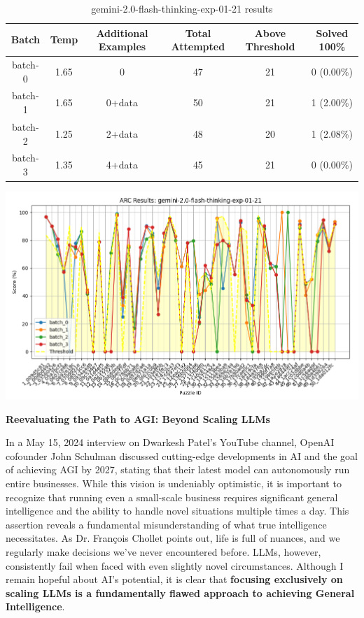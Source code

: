 \documentclass[11pt]{scrartcl}
\begin{document}
\begin{table}[h]
    \centering
    \begin{tabular}{|c|c|c|c|c|c|}
        \hline
        Batch & Temp & Additional Examples & Total Attempted & Above Threshold & Solved 100\% \\ 
        \hline
        batch-0 & 1.65 & 0 & 47 & 21 & 0 (0.00\%)   \\ 
        batch-1 & 1.65 & 0+data & 50 & 21 & 1 (2.00\%)   \\ 
        batch-2 & 1.25 & 2+data & 48 & 20 & 1 (2.08\%)   \\ 
        batch-3 & 1.35 & 4+data & 45 & 21 & 0 (0.00\%)   \\ 
        \hline
    \end{tabular}
    \caption{ gemini-2.0-flash-thinking-exp-01-21 results }
    \label{tab:example}
\end{table}

\includegraphics[width=0.99\linewidth, center]{gemini-2.0-flash-thinking-exp-01-21.png}

\vspace{2cm}

\begin{huge}
\textbf{Reevaluating the Path to AGI: Beyond Scaling LLMs}
\end{huge}
In a May 15, 2024 interview on Dwarkesh Patel’s YouTube channel\cite{ref8}, OpenAI cofounder John Schulman discussed cutting-edge developments in AI and the goal of achieving AGI by 2027, stating that their latest model can autonomously run entire businesses. While this vision is undeniably optimistic, it is important to recognize that running even a small-scale business requires significant general intelligence and the ability to handle novel situations multiple times a day. This assertion reveals a fundamental misunderstanding of what true intelligence necessitates. As Dr. François Chollet points out, life is full of nuances, and we regularly make decisions we've never encountered before. LLMs, however, consistently fail when faced with even slightly novel circumstances. Although I remain hopeful about AI's potential, it is clear that \textbf{focusing exclusively on scaling LLMs is a fundamentally flawed approach to achieving General Intelligence}.
\end{document}
